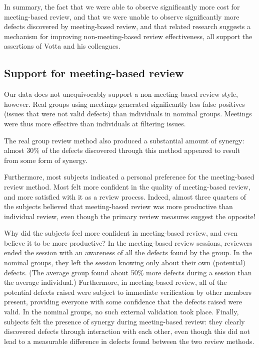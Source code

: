 In summary, the fact that we were able to observe significantly more cost for
meeting-based review, and that we were unable to observe significantly more
defects discovered by meeting-based review, and that related research
suggests a mechanism for improving non-meeting-based review effectiveness, 
all support the assertions of Votta and his colleagues.

\subsection{Support for meeting-based review}

Our data does not unequivocably support a non-meeting-based review style,
however. Real groups using meetings generated significantly less
false positives (issues that were not valid defects) than individuals
in nominal groups. Meetings were thus more effective than individuals at
filtering issues. 

The real group review method also produced a substantial amount of synergy:
almost 30\% of the defects discovered through this method appeared to
result from some form of synergy.

Furthermore, most subjects indicated a personal preference for the
meeting-based review method. Most felt more confident in the quality of
meeting-based review, and more satisfied with it as a review process.
Indeed, almost three quarters of the subjects believed that meeting-based
review was more productive than individual review, even though the primary
review measures suggest the opposite!

Why did the subjects feel more confident in meeting-based review, and even
believe it to be more productive?  In the meeting-based review sessions,
reviewers ended the session with an awareness of all the defects found by
the group.  In the nominal groups, they left the session knowing only about
their own (potential) defects. (The average group found about 50\% more
defects during a session than the average individual.)  Furthermore, in
meeting-based review, all of the potential defects raised were subject to
immediate verification by other members present, providing everyone with
some confidence that the defects raised were valid. In the nominal groups,
no such external validation took place.  Finally, subjects felt the
presence of synergy during meeting-based review: they clearly discovered
defects through interaction with each other, even though this did not lead
to a measurable difference in defects found between the two review methods.

